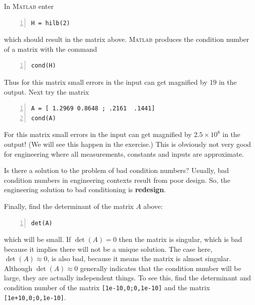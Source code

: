 In \textsc{Matlab} enter
\begin{lstlisting}[frame=none,numbers=left]
H = hilb(2)
\end{lstlisting}
which should result in the matrix above. \textsc{Matlab} produces the
condition number of a matrix with the command
\begin{lstlisting}[frame=none,numbers=left]
cond(H)
\end{lstlisting}
Thus for this matrix small errors in the input can get magnified
by 19 in the output.
Next try the matrix
\begin{lstlisting}[frame=none,numbers=left]
A = [ 1.2969 0.8648 ; .2161  .1441]
cond(A)
\end{lstlisting}
For this matrix small errors in the input can get magnified
by $2.5 \times 10^8$ in the output! (We will see this happen in the exercise.)
This is obviously not very good for engineering
where all measurements, constants and inputs are approximate.

Is there a solution to the problem of bad condition numbers?
Usually, bad condition numbers in engineering contexts result
from poor design. So, the engineering solution to bad conditioning
is {\bf redesign}.

Finally, find the determinant of the matrix $A$ above:
\begin{lstlisting}[frame=none,numbers=left]
det(A)
\end{lstlisting}
which will be small. If $\det(A) = 0$ then the matrix is singular,
which is bad because it implies there will not be a unique solution.
The case here, $\det(A) \approx 0$, is also bad, because it means the
matrix is almost singular. Although $\det(A) \approx 0$ generally
indicates that the condition number will be large, they are actually
independent things. To see this, find the determinant and condition
number of the matrix \verb&[1e-10,0;0,1e-10]& and
the matrix \verb&[1e+10,0;0,1e-10]&.

\newpage

